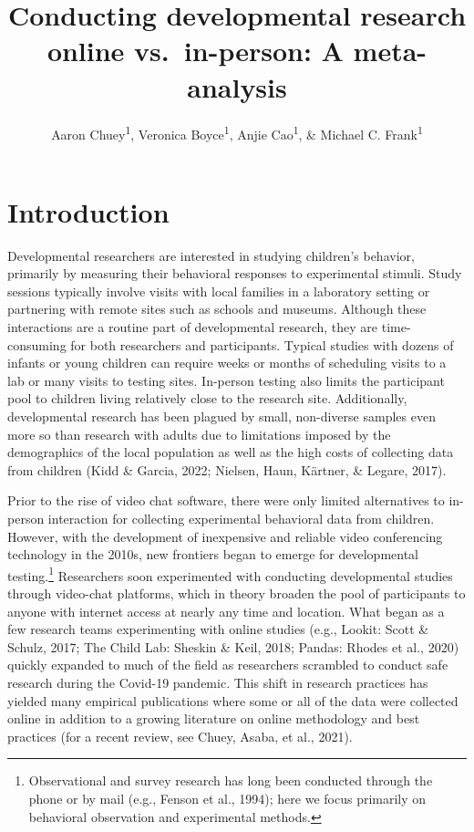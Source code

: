 \documentclass[
  man,floatsintext]{apa6}
\title{Conducting developmental research online vs.~in-person: A meta-analysis}
\author{Aaron Chuey\textsuperscript{1}, Veronica Boyce\textsuperscript{1}, Anjie Cao\textsuperscript{1}, \& Michael C. Frank\textsuperscript{1}}
\date{}
\affiliation{\vspace{0.5cm}\textsuperscript{1} Stanford University}
\begin{document}
\maketitle

\hypertarget{introduction}{%
\section{Introduction}\label{introduction}}

Developmental researchers are interested in studying children's behavior, primarily by measuring their behavioral responses to experimental stimuli. Study sessions typically involve visits with local families in a laboratory setting or partnering with remote sites such as schools and museums. Although these interactions are a routine part of developmental research, they are time-consuming for both researchers and participants. Typical studies with dozens of infants or young children can require weeks or months of scheduling visits to a lab or many visits to testing sites. In-person testing also limits the participant pool to children living relatively close to the research site. Additionally, developmental research has been plagued by small, non-diverse samples even more so than research with adults due to limitations imposed by the demographics of the local population as well as the high costs of collecting data from children (Kidd \& Garcia, 2022; Nielsen, Haun, Kärtner, \& Legare, 2017).

Prior to the rise of video chat software, there were only limited alternatives to in-person interaction for collecting experimental behavioral data from children. However, with the development of inexpensive and reliable video conferencing technology in the 2010s, new frontiers began to emerge for developmental testing.\footnote{Observational and survey research has long been conducted through the phone or by mail (e.g., Fenson et al., 1994); here we focus primarily on behavioral observation and experimental methods.} Researchers soon experimented with conducting developmental studies through video-chat platforms, which in theory broaden the pool of participants to anyone with internet access at nearly any time and location. What began as a few research teams experimenting with online studies (e.g., Lookit: Scott \& Schulz, 2017; The Child Lab: Sheskin \& Keil, 2018; Pandas: Rhodes et al., 2020) quickly expanded to much of the field as researchers scrambled to conduct safe research during the Covid-19 pandemic. This shift in research practices has yielded many empirical publications where some or all of the data were collected online in addition to a growing literature on online methodology and best practices (for a recent review, see Chuey, Asaba, et al., 2021).
\end{document}
